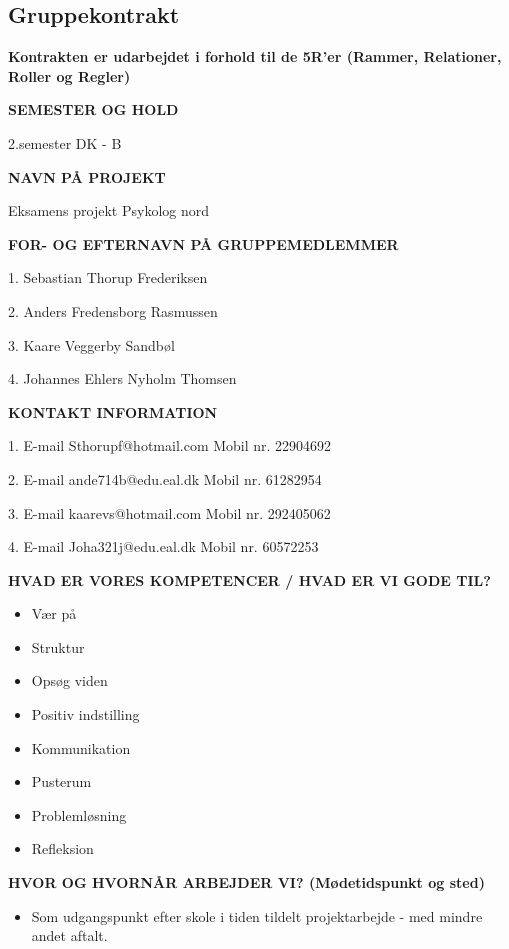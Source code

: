 \subsection{Gruppekontrakt}


\textbf{Kontrakten er udarbejdet i forhold til de 5R'er (Rammer, Relationer, Roller og Regler) }

\textbf{SEMESTER OG HOLD} 

2.semester DK - B 

 

\textbf{NAVN PÅ PROJEKT} 

Eksamens projekt Psykolog nord 


\textbf{FOR- OG EFTERNAVN PÅ GRUPPEMEDLEMMER} 

1. Sebastian Thorup Frederiksen 

2. Anders Fredensborg Rasmussen 

3. Kaare Veggerby Sandbøl 

4. Johannes Ehlers Nyholm Thomsen 

 

\textbf{KONTAKT INFORMATION} 

1. E-mail Sthorupf@hotmail.com  Mobil nr. 22904692 

2. E-mail ande714b@edu.eal.dk  Mobil nr. 61282954 

3. E-mail kaarevs@hotmail.com  Mobil nr. 292405062 

4. E-mail Joha321j@edu.eal.dk Mobil nr. 60572253 
 

 

\textbf{HVAD ER VORES KOMPETENCER / HVAD ER VI GODE TIL? }
\begin{itemize}
\item Vær på 

\item Struktur 

\item Opsøg viden 

\item Positiv indstilling 

\item Kommunikation 

\item Pusterum 

\item Problemløsning 

\item Refleksion 
\end{itemize}
\textbf{HVOR OG HVORNÅR ARBEJDER VI?  (Mødetidspunkt og sted) }
\begin{itemize}
\item Som udgangspunkt efter skole i tiden tildelt projektarbejde - med mindre andet aftalt. 
\end{itemize}


